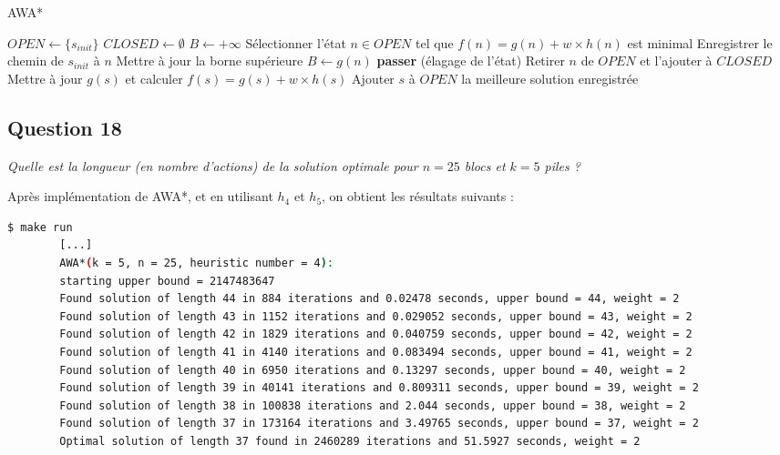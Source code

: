 \begin{algorithm}[H]
    \caption{AWA*}
    \begin{algorithmic}[1]
    \State $OPEN \gets \{s_{init}\}$
    \State $CLOSED \gets \emptyset$
    \State $B \gets +\infty$
        \State Sélectionner l'état $n \in OPEN$ tel que $f(n) = g(n) + w \times h(n)$ est minimal
            \State Enregistrer le chemin de $s_{init}$ à $n$
            \State Mettre à jour la borne supérieure $B \gets g(n)$
        \EndIf
            \State \textbf{passer} (élagage de l'état)
        \EndIf
        \State Retirer $n$ de $OPEN$ et l'ajouter à $CLOSED$
                \State Mettre à jour $g(s)$ et calculer $f(s) = g(s) + w \times h(s)$
                \State Ajouter $s$ à $OPEN$
            \EndIf
        \EndFor
    \EndWhile
    \State \Return la meilleure solution enregistrée
    \end{algorithmic}
\end{algorithm}

\subsection{Question 18}

\textit{Quelle est la longueur (en nombre d'actions) de la solution optimale pour $n = 25$ blocs et $k = 5$ piles ?}

Après implémentation de AWA*, et en utilisant $h_4$ et $h_5$, on obtient les résultats suivants :

\begin{minipage}{\dimexpr\linewidth-20pt}
    \begin{lstlisting}[language=bash, caption={Résultats de l'exécution du programme de recherche de plus court chemin avec l'heuristique $h_4$ et \textit{AWA*} pour $k = 5$ piles et $n = 25$ blocs.}, label={lst:plus_court_chemin_results_h4_k4_n20}]
        $ make run
        [...]
        AWA*(k = 5, n = 25, heuristic number = 4): 
        starting upper bound = 2147483647
        Found solution of length 44 in 884 iterations and 0.02478 seconds, upper bound = 44, weight = 2
        Found solution of length 43 in 1152 iterations and 0.029052 seconds, upper bound = 43, weight = 2
        Found solution of length 42 in 1829 iterations and 0.040759 seconds, upper bound = 42, weight = 2
        Found solution of length 41 in 4140 iterations and 0.083494 seconds, upper bound = 41, weight = 2
        Found solution of length 40 in 6950 iterations and 0.13297 seconds, upper bound = 40, weight = 2
        Found solution of length 39 in 40141 iterations and 0.809311 seconds, upper bound = 39, weight = 2
        Found solution of length 38 in 100838 iterations and 2.044 seconds, upper bound = 38, weight = 2
        Found solution of length 37 in 173164 iterations and 3.49765 seconds, upper bound = 37, weight = 2
        Optimal solution of length 37 found in 2460289 iterations and 51.5927 seconds, weight = 2
    \end{lstlisting}
\end{minipage}

